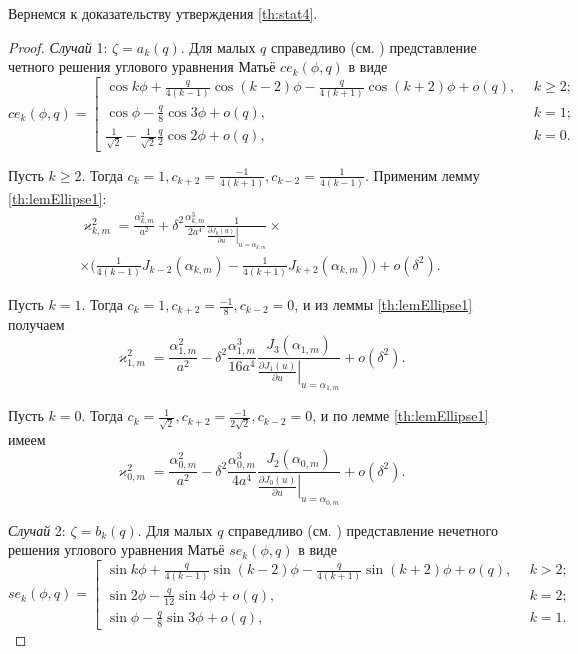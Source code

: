 Вернемся к доказательству утверждения \ref{th:stat4}.
\begin{proof}
\textit{Случай} 1: $\zeta = a_k(q)$.
Для малых $q$ справедливо (см. \cite{wref2}) представление четного решения углового уравнения Матьё $ce_k(\phi, q)$ в виде 
{
\[
ce_k(\phi, q) = 
\left[
\begin{array}{ll}
	\cos{k\phi} + 
	\frac{q}{4(k-1)} \cos{(k-2)\phi} - 
	\frac{q}{4(k+1)} \cos{(k+2)\phi} + o(q), \ \ & k \geq 2;\\
	\cos{\phi} - \frac{q}{8} \cos{3 \phi} + o(q), & k = 1; \\
	\frac{1}{\sqrt{2}} - \frac{1}{\sqrt{2}}\frac{q}{2}\cos{2 \phi} + o(q), & k = 0. 
\end{array}
\right.
\]
}

Пусть $k \geq 2$. Тогда $c_k = 1, c_{k+2}=\frac{-1}{4(k+1)},  c_{k-2}=\frac{1}{4(k-1)}$. Применим лемму \ref{th:lemEllipse1}:
\begin{multline*}
\varkappa_{k, m}^2 = 
\frac{\alpha_{k, m}^2}{a^2} +  \delta^2 \frac{\alpha_{k, m}^3}{2 a^4}\frac{1}{\left.\frac{\partial J_{k} (u)}{\partial u}\right|_{u=\alpha_{k, m}}} \times \\ \times
\biggl(
\frac{1}{4(k-1)} J_{k-2}(\alpha_{k, m}) - \frac{1}{4(k+1)}J_{k+2}(\alpha_{k, m})
\biggr) + o(\delta^2).
\end{multline*}

Пусть $k =1$. Тогда $c_k = 1, c_{k+2}=\frac{-1}{8},  c_{k-2}=0$, и из леммы \ref{th:lemEllipse1} получаем
$$
\varkappa_{1, m}^2 = 
\frac{\alpha_{1, m}^2}{a^2} -  \delta^2 \frac{\alpha_{1, m}^3}{16 a^4}\frac{J_{3}(\alpha_{1, m})}{\left.\frac{\partial J_{1} (u)}{\partial u}\right|_{u=\alpha_{1, m}}}  + o(\delta^2).
$$

Пусть $k =0$. Тогда $c_k = \frac{1}{\sqrt{2}}, c_{k+2}=\frac{-1}{2\sqrt{2}},  c_{k-2}=0$, и по лемме \ref{th:lemEllipse1} имеем
$$
\varkappa_{0, m}^2 = 
\frac{\alpha_{0, m}^2}{a^2} -  \delta^2 \frac{\alpha_{0, m}^3}{4 a^4}\frac{J_{2}(\alpha_{0, m})}{\left.\frac{\partial J_{0} (u)}{\partial u}\right|_{u=\alpha_{0, m}}} 
 + o(\delta^2).
$$

\textit{Случай} 2: $\zeta = b_k(q)$.
Для малых $q$ справедливо (см. \cite{wref2}) представление нечетного решения углового уравнения Матьё $se_k(\phi, q)$ в виде 
{
\[
se_k(\phi, q) = 
\left[
\begin{array}{ll}
	\sin{k\phi} + 
	\frac{q}{4(k-1)} \sin{(k-2)\phi} - 
	\frac{q}{4(k+1)} \sin{(k+2)\phi} + o(q), \ \ & k > 2;\\
	\sin{2\phi} - \frac{q}{12} \sin{4 \phi} + o(q), & k = 2; \\
	\sin{\phi} - \frac{q}{8}\sin{3 \phi} + o(q), & k = 1. 
\end{array}
\right.
\]
}


\end{proof}
